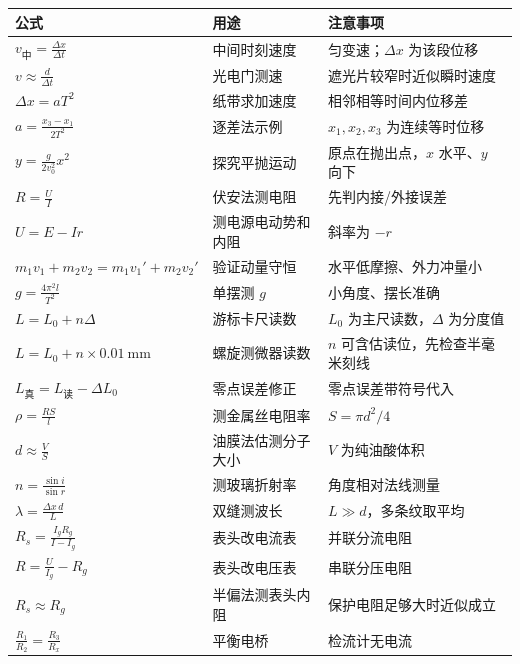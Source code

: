 \begin{center}
\small
\begin{tabular}{lll}
\toprule
公式 & 用途 & 注意事项 \\
\midrule
$v_{\text{中}}=\frac{\Delta x}{\Delta t}$ & 中间时刻速度 & 匀变速；$\Delta x$ 为该段位移 \\
$v\approx\frac{d}{\Delta t}$ & 光电门测速 & 遮光片较窄时近似瞬时速度 \\
$\Delta x=aT^2$ & 纸带求加速度 & 相邻相等时间内位移差 \\
$a=\frac{x_3-x_1}{2T^2}$ & 逐差法示例 & $x_1,x_2,x_3$ 为连续等时位移 \\
$y=\frac{g}{2v_0^2}x^2$ & 探究平抛运动 & 原点在抛出点，$x$ 水平、$y$ 向下 \\
$R=\frac{U}{I}$ & 伏安法测电阻 & 先判内接/外接误差 \\
$U=E-Ir$ & 测电源电动势和内阻 & 斜率为 $-r$ \\
$m_1v_1+m_2v_2=m_1v_1'+m_2v_2'$ & 验证动量守恒 & 水平低摩擦、外力冲量小 \\
$g=\frac{4\pi^2l}{T^2}$ & 单摆测 $g$ & 小角度、摆长准确 \\
$L=L_0+n\Delta$ & 游标卡尺读数 & $L_0$ 为主尺读数，$\Delta$ 为分度值 \\
$L=L_0+n\times0.01\ \mathrm{mm}$ & 螺旋测微器读数 & $n$ 可含估读位，先检查半毫米刻线 \\
$L_{\text{真}}=L_{\text{读}}-\Delta L_0$ & 零点误差修正 & 零点误差带符号代入 \\
$\rho=\frac{RS}{l}$ & 测金属丝电阻率 & $S=\pi d^2/4$ \\
$d\approx\frac{V}{S}$ & 油膜法估测分子大小 & $V$ 为纯油酸体积 \\
$n=\frac{\sin i}{\sin r}$ & 测玻璃折射率 & 角度相对法线测量 \\
$\lambda=\frac{\Delta x\,d}{L}$ & 双缝测波长 & $L\gg d$，多条纹取平均 \\
$R_s=\frac{I_gR_g}{I-I_g}$ & 表头改电流表 & 并联分流电阻 \\
$R=\frac{U}{I_g}-R_g$ & 表头改电压表 & 串联分压电阻 \\
$R_s\approx R_g$ & 半偏法测表头内阻 & 保护电阻足够大时近似成立 \\
$\frac{R_1}{R_2}=\frac{R_3}{R_x}$ & 平衡电桥 & 检流计无电流 \\
\bottomrule
\end{tabular}
\end{center}


